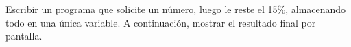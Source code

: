 ﻿
Escribir un programa que solicite un número, luego le reste el 15\%, almacenando todo en una única variable. A continuación, mostrar el resultado final por pantalla.



\volverindice
\newpage
